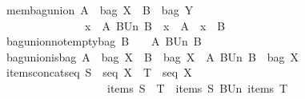 \begin{isabellebody}
\ \ mem{\isacharunderscore}bagunion{\isacharcolon}\ {\isachardoublequoteopen}{\isacharparenleft}A\ {\isacharcolon}\ {\isacharparenleft}bag\ X{\isacharparenright}{\isacharparenright}\ {\isacharminus}{\isacharminus}{\isachargreater}\ {\isacharparenleft}B\ {\isacharcolon}\ {\isacharparenleft}bag\ Y{\isacharparenright}{\isacharparenright}\ {\isacharminus}{\isacharminus}{\isachargreater}\ \isanewline
\ \ \ \ \ \ \ \ \ \ \ \ \ \ \ \ {\isacharparenleft}x\ {\isacharbrackleft}{\isacharcolon}\ {\isacharparenleft}A\ BUn\ B{\isacharparenright}{\isacharparenright}\ {\isacharequal}\ {\isacharparenleft}{\isacharparenleft}x\ {\isacharbrackleft}{\isacharcolon}\ A{\isacharparenright}\ {\isacharbar}\ {\isacharparenleft}x\ {\isacharbrackleft}{\isacharcolon}\ B{\isacharparenright}{\isacharparenright}{\isachardoublequoteclose}\isanewline
\ \ bagunion{\isacharunderscore}not{\isacharunderscore}emptybag{\isacharcolon}\ {\isachardoublequoteopen}{\isacharparenleft}B\ {\isachartilde}{\isacharequal}\ {\isacharpercent}{\isacharbrackleft}{\isacharpercent}{\isacharbrackright}{\isacharparenright}\ {\isacharminus}{\isacharminus}{\isachargreater}\ {\isacharparenleft}{\isacharparenleft}A\ BUn\ B{\isacharparenright}\ {\isachartilde}{\isacharequal}\ {\isacharpercent}{\isacharbrackleft}{\isacharpercent}{\isacharbrackright}{\isacharparenright}{\isachardoublequoteclose}\isanewline
\ \ bagunion{\isacharunderscore}is{\isacharunderscore}bag{\isacharcolon}\ {\isachardoublequoteopen}{\isacharparenleft}A\ {\isacharcolon}\ {\isacharparenleft}bag\ X{\isacharparenright}{\isacharparenright}\ {\isacharminus}{\isacharminus}{\isachargreater}\ {\isacharparenleft}B\ {\isacharcolon}\ {\isacharparenleft}bag\ X{\isacharparenright}{\isacharparenright}\ {\isacharminus}{\isacharminus}{\isachargreater}\ {\isacharparenleft}{\isacharparenleft}A\ BUn\ B{\isacharparenright}\ {\isacharcolon}\ {\isacharparenleft}bag\ X{\isacharparenright}{\isacharparenright}{\isachardoublequoteclose}\isanewline
\ \ items{\isacharunderscore}concatseq{\isacharcolon}\ {\isachardoublequoteopen}{\isacharparenleft}S\ {\isacharcolon}\ {\isacharparenleft}seq\ X{\isacharparenright}{\isacharparenright}\ {\isacharminus}{\isacharminus}{\isachargreater}\ {\isacharparenleft}T\ {\isacharcolon}\ {\isacharparenleft}seq\ X{\isacharparenright}{\isacharparenright}\ {\isacharminus}{\isacharminus}{\isachargreater}\isanewline
\ \ \ \ \ \ \ \ \ \ \ \ \ \ \ \ \ \ \ \ {\isacharparenleft}{\isacharparenleft}items\ {\isacharparenleft}S\ {\isacharpercent}{\isacharampersand}{\isacharcircum}\ T{\isacharparenright}{\isacharparenright}\ {\isacharequal}\ {\isacharparenleft}{\isacharparenleft}items\ S{\isacharparenright}\ BUn\ {\isacharparenleft}items\ T{\isacharparenright}{\isacharparenright}{\isacharparenright}{\isachardoublequoteclose}\isanewline

\end{isabellebody}
